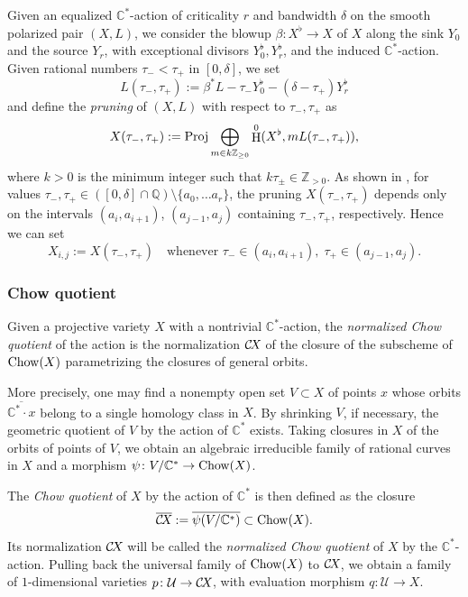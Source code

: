 \documentclass[10pt,a4paper]{article}
\numberwithin{equation}{section}
\theoremstyle{definition}
\theoremstyle{remark}
\DeclareMathOperator{\HH}{H}
\def\C{{\mathbb C}}
\def\Q{{\mathbb Q}}
\def\Z{{\mathbb Z}}
\def\cU{{\mathcal U}}
\def\Q{{\mathbb{Q}}}
\def\operatorname#1{\mathop{\rm #1}\nolimits}
\def\Proj{\operatorname{Proj}}
\def\Chow{\operatorname{Chow}}
\def\CX{\mathcal{C}\!X\hspace{-0.5pt}}
\begin{document}
Given an equalized $\C^*$-action of criticality $r$ and bandwidth $\delta$ on the smooth polarized pair $(X,L)$,  we consider the blowup $\beta\colon X^\flat\to X$ of $X$ along the sink $Y_0$  and the source $Y_r$, with exceptional divisors $Y^\flat_0,Y^\flat_r$, and the induced $\C^*$-action.
Given rational numbers $\tau_-<\tau_+$ in $[0,\delta]$, we set
\[
L(\tau_-,\tau_+):=\beta^*L-\tau_-Y^\flat_0-(\delta-\tau_+)Y^\flat_r 
\]
and define the {\em pruning} of $(X,L)$ with respect to $\tau_-,\tau_+$ as
\[X(\tau_-,\tau_+):=\Proj \bigoplus_{m\in k\Z_{\geq 0}}\HH^0(X^\flat,mL(\tau_-,\tau_+)),\]
where $k>0$ is the minimum integer such that $k\tau_\pm\in \Z_{> 0}$.
As shown in \cite[Lemma 3.5]{WORS6}, for values $\tau_-,\tau_+\in([0,\delta]\cap\Q)\setminus\{a_0,\dots a_r\}$, the pruning $X(\tau_-,\tau_+)$ depends only on the intervals $(a_i,a_{i+1})$, $ (a_{j-1},a_j)$ containing $\tau_-,\tau_+$, respectively. Hence we can set
$$X_{i,j}:=X(\tau_-,\tau_+)\quad\mbox{whenever } \tau_-\in(a_i,a_{i+1}), \;\tau_+\in (a_{j-1},a_j).$$ 

\subsubsection{Chow quotient}

Given a projective variety $X$ with a nontrivial $\C^*$-action, the {\em normalized Chow quotient} of the action is the normalization $\CX$ of the closure of the subscheme of $\Chow(X)$ parametrizing the closures of general orbits.

More precisely, one may find a nonempty open set $V\subset X$ of points $x$ whose orbits $\overline{\C^*\cdot x}$ belong to a single homology class in $X$. By shrinking $V$, if necessary, the geometric quotient of $V$ by the action of $\C^*$ exists. Taking closures in $X$ of the orbits of points of $V$, we obtain an algebraic irreducible family of rational curves in $X$ and a morphism $\psi\colon V/\C^*\to \Chow(X)$.

The {\em Chow quotient} of $X$ by the action of $\C^*$ is then defined as the closure 
$$
\overline{\CX}:=\overline{\psi(V/\C^*)}\subset \Chow(X).
$$
Its normalization $\CX$ will be called the {\em normalized Chow quotient} of $X$ by the $\C^*$-action.  Pulling back the universal family of $\Chow(X)$ to $\CX$, we obtain a family of $1$-dimensional varieties $p\colon\cU\to \CX$, with evaluation morphism $q\colon\cU\to X$.
\end{document}
